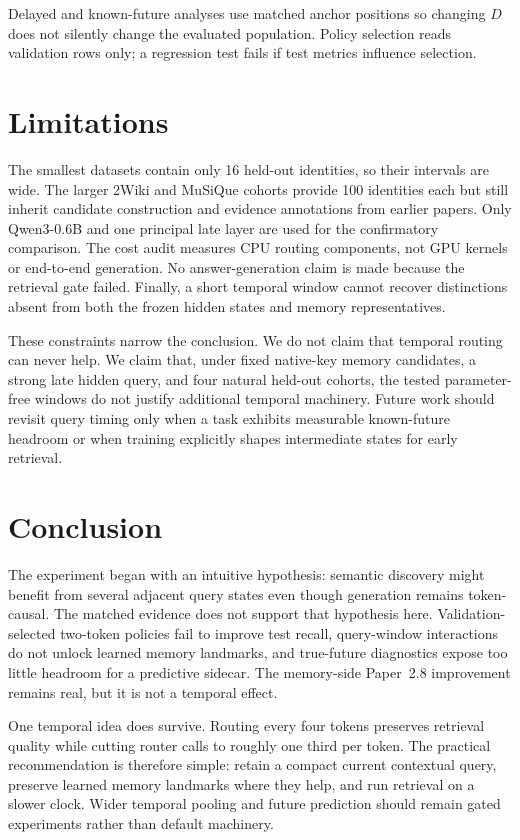 \documentclass[11pt]{article}
\begin{document}
Delayed and known-future analyses use matched anchor positions so changing $D$ does not silently change the evaluated population. Policy selection reads validation rows only; a regression test fails if test metrics influence selection.

\section{Limitations}
The smallest datasets contain only 16 held-out identities, so their intervals are wide. The larger 2Wiki and MuSiQue cohorts provide 100 identities each but still inherit candidate construction and evidence annotations from earlier papers. Only Qwen3-0.6B and one principal late layer are used for the confirmatory comparison. The cost audit measures CPU routing components, not GPU kernels or end-to-end generation. No answer-generation claim is made because the retrieval gate failed. Finally, a short temporal window cannot recover distinctions absent from both the frozen hidden states and memory representatives.

These constraints narrow the conclusion. We do not claim that temporal routing can never help. We claim that, under fixed native-key memory candidates, a strong late hidden query, and four natural held-out cohorts, the tested parameter-free windows do not justify additional temporal machinery. Future work should revisit query timing only when a task exhibits measurable known-future headroom or when training explicitly shapes intermediate states for early retrieval.

\section{Conclusion}
The experiment began with an intuitive hypothesis: semantic discovery might benefit from several adjacent query states even though generation remains token-causal. The matched evidence does not support that hypothesis here. Validation-selected two-token policies fail to improve test recall, query-window interactions do not unlock learned memory landmarks, and true-future diagnostics expose too little headroom for a predictive sidecar. The memory-side Paper~2.8 improvement remains real, but it is not a temporal effect.

One temporal idea does survive. Routing every four tokens preserves retrieval quality while cutting router calls to roughly one third per token. The practical recommendation is therefore simple: retain a compact current contextual query, preserve learned memory landmarks where they help, and run retrieval on a slower clock. Wider temporal pooling and future prediction should remain gated experiments rather than default machinery.
\end{document}

